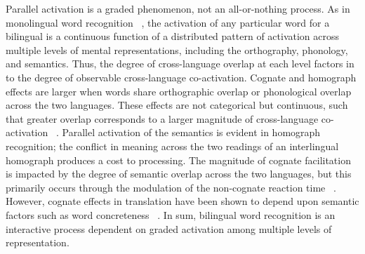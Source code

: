 Parallel activation is a graded phenomenon, not an all-or-nothing process. As in monolingual word recognition ~\citep{Seidenberg1989}, the activation of any particular word for a bilingual is a continuous function of a distributed pattern of activation across multiple levels of mental representations, including the orthography, phonology, and semantics. Thus, the degree of cross-language overlap at each level factors in to the degree of observable cross-language co-activation. Cognate and homograph effects are larger when words share orthographic overlap or phonological overlap across the two languages. These effects are not categorical but continuous, such that greater overlap corresponds to a larger magnitude of cross-language co-activation ~\citep[e.g.,][]{Duyck2007,Schwartz2007, VanAssche2010, VanAssche2009}. Parallel activation of the semantics is evident in homograph recognition; the conflict in meaning across the two readings of an interlingual homograph produces a cost to processing. The magnitude of cognate facilitation is impacted by the degree of semantic overlap across the two languages, but this primarily occurs through the modulation of the non-cognate reaction time ~\citep{Garcia-Albea1998}. However, cognate effects in translation have been shown to depend upon semantic factors such as word concreteness ~\citep[e.g.,][]{VanHell2008}. In sum, bilingual word recognition is an interactive process dependent on graded activation among multiple levels of representation. 

